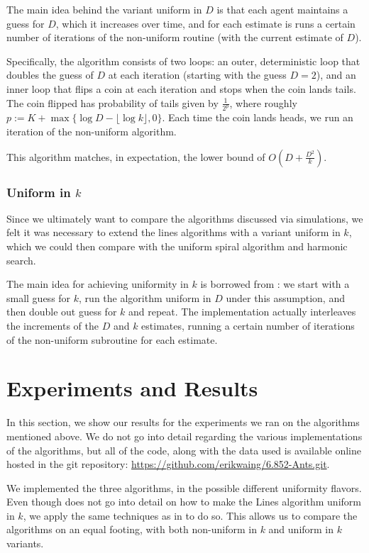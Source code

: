 \documentclass[runningheads,a4paper]{llncs}
\begin{document}
The main idea behind the variant uniform in $D$ is that each agent maintains a guess for $D$, which it increases over time, and for each estimate is runs a certain number of iterations of the non-uniform routine (with the current estimate of $D$).

Specifically, the algorithm consists of two loops: an outer, deterministic loop that doubles the guess of $D$ at each iteration (starting with the guess $D = 2$), and an inner loop that flips a coin at each iteration and stops when the coin lands tails. The coin flipped has probability of tails given by $\frac{1}{2^p}$, where roughly $p := K + \max \{ \log D - \lfloor \log k \rfloor, 0 \}$. Each time the coin lands heads, we run an iteration of the non-uniform algorithm.

This algorithm matches, in expectation, the lower bound of $O(D + \frac{D^2}{k})$.

\subsubsection{Uniform in $k$}

Since we ultimately want to compare the algorithms discussed via simulations, we felt it was necessary to extend the lines algorithms with a variant uniform in $k$, which we could then compare with the uniform spiral algorithm and harmonic search.

The main idea for achieving uniformity in $k$ is borrowed from \cite{feinerman2012collaborative}: we start with a small guess for $k$, run the algorithm uniform in $D$ under this assumption, and then double out guess for $k$ and repeat. The implementation actually interleaves the increments of the $D$ and $k$ estimates, running a certain number of iterations of the non-uniform subroutine for each estimate.


\section{Experiments and Results}
\label{experiments}

In this section, we show our results for the experiments we ran on the algorithms mentioned above. We do not go into detail regarding the various implementations of the algorithms, but all of the code, along with the data used is available online hosted in the git repository: \url{https://github.com/erikwaing/6.852-Ants.git}. 

We implemented the three algorithms, in the possible different uniformity flavors. Even though \cite{lenzen2014trade} does not go into detail on how to make the Lines algorithm uniform in $k$, we apply the same techniques as in \cite{feinerman2012collaborative} to do so. This allows us to compare the algorithms on an equal footing, with both non-uniform in $k$ and uniform in $k$ variants. 
\end{document}
